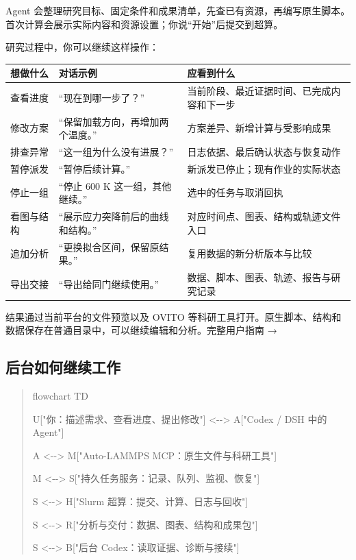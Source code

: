 \documentclass[11pt,a4paper]{ctexart}
\begin{document}
Agent 会整理研究目标、固定条件和成果清单，先查已有资源，再编写原生脚本。首次计算会展示实际内容和资源设置；你说“开始”后提交到超算。



研究过程中，你可以继续这样操作：



\begin{longtable}{p{4.67cm}p{4.67cm}p{4.67cm}}
\toprule
想做什么 & 对话示例 & 应看到什么 \\
\midrule\endhead
查看进度 & “现在到哪一步了？” & 当前阶段、最近证据时间、已完成内容和下一步 \\
修改方案 & “保留加载方向，再增加两个温度。” & 方案差异、新增计算与受影响成果 \\
排查异常 & “这一组为什么没有进展？” & 日志依据、最后确认状态与恢复动作 \\
暂停派发 & “暂停后续计算。” & 新派发已停止；现有作业的实际状态 \\
停止一组 & “停止 600 K 这一组，其他继续。” & 选中的任务与取消回执 \\
看图与结构 & “展示应力突降前后的曲线和结构。” & 对应时间点、图表、结构或轨迹文件入口 \\
追加分析 & “更换拟合区间，保留原结果。” & 复用数据的新分析版本与比较 \\
导出交接 & “导出给同门继续使用。” & 数据、脚本、图表、轨迹、报告与研究记录 \\
\bottomrule
\end{longtable}


结果通过当前平台的文件预览以及 OVITO 等科研工具打开。原生脚本、结构和数据保存在普通目录中，可以继续编辑和分析。完整用户指南 →



\subsection{后台如何继续工作}


\begin{quote}\small
flowchart TD\par
    U["你：描述需求、查看进度、提出修改"] <-{}-> A["Codex /\allowbreak{} DSH 中的 Agent"]\par
    A <-{}-> M["Auto-LAMMPS MCP：原生文件与科研工具"]\par
    M <-{}-> S["持久任务服务：记录、队列、监视、恢复"]\par
    S <-{}-> H["Slurm 超算：提交、计算、日志与回收"]\par
    S <-{}-> R["分析与交付：数据、图表、结构和成果包"]\par
    S <-{}-> B["后台 Codex：读取证据、诊断与接续"]\par
\end{quote}
\end{document}
